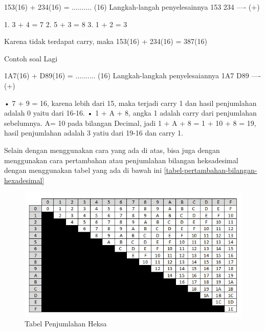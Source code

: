 	153(16) + 234(16) = .......... (16) 
	Langkah-langah penyelesainnya
	153 
	234 
	---- (+)

	1. 3 + 4 = 7
	2. 5 + 3 = 8
	3. 1 + 2 = 3

	Karena tidak terdapat carry, maka 153(16) + 234(16) = 387(16)

	Contoh soal Lagi 

	1A7(16) + D89(16) = .......... (16)
	Langkah-langkah penyelesaiannya
	1A7
	D89
	---- (+)

	•	7 + 9 = 16, karena lebih dari 15, maka terjadi carry 1 dan hasil penjumlahan adalah 0 yaitu dari 16-16.
	•	1 + A + 8, angka 1 adalah carry dari penjumlahan sebelumnya. A= 10 pada bilangan Decimal, jadi 1 + A + 8 = 1 + 10 + 8 = 19, hasil penjumlahan adalah 3 yatiu dari 19-16 dan carry 1.
	
	Selain dengan menggunakan cara yang ada di atas, bisa juga dengan menggunakan cara pertambahan atau penjumlahan bilangan heksadesimal dengan menggunakan tabel yang ada di bawah ini \ref{tabel-pertambahan-bilangan-hexadesimal}
			\begin{figure} [ht]
				\centerline{\includegraphics[width=1\textwidth]{figures/tabel-pertambahan-bilangan-hexadesimal.jpg}}

\caption{Tabel Penjumlahan Heksa}
				\label{Tabel-Penjumlahan-Heksa}
			\end{figure}

